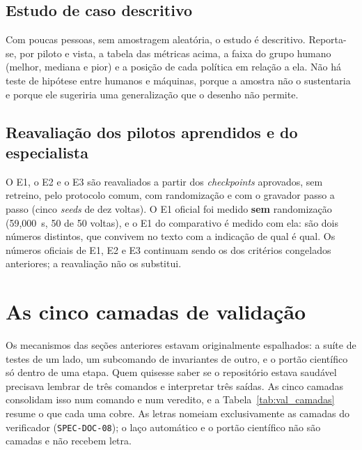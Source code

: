 \subsection{Estudo de caso descritivo}

Com poucas pessoas, sem amostragem aleatória, o estudo é descritivo. Reporta-se,
por piloto e vista, a tabela das métricas acima, a faixa do grupo humano (melhor,
mediana e pior) e a posição de cada política em relação a ela. Não há teste de
hipótese entre humanos e máquinas, porque a amostra não o sustentaria e porque
ele sugeriria uma generalização que o desenho não permite.

\subsection{Reavaliação dos pilotos aprendidos e do especialista}

O E1, o E2 e o E3 são reavaliados a partir dos \textit{checkpoints} aprovados, sem
retreino, pelo protocolo comum, com randomização e com o gravador passo a passo
(cinco \textit{seeds} de dez voltas). O E1 oficial foi medido \textbf{sem}
randomização (59,000~s, 50 de 50 voltas), e o E1 do comparativo é medido com ela:
são dois números distintos, que convivem no texto com a indicação de qual é qual.
Os números oficiais de E1, E2 e E3 continuam sendo os dos critérios congelados
anteriores; a reavaliação não os substitui.

\section{As cinco camadas de validação}\label{sec:val-camadas}

Os mecanismos das seções anteriores estavam originalmente espalhados: a suíte de
testes de um lado, um subcomando de invariantes de outro, e o portão científico
só dentro de uma etapa. Quem quisesse saber se o repositório estava saudável
precisava lembrar de três comandos e interpretar três saídas. As cinco camadas
consolidam isso num comando e num veredito, e a Tabela~\ref{tab:val_camadas}
resume o que cada uma cobre. As letras nomeiam exclusivamente as camadas do
verificador (\texttt{SPEC-DOC-08}); o laço automático e o portão científico não
são camadas e não recebem letra.

